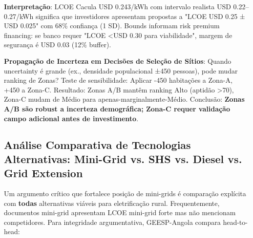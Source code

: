 \documentclass[12pt, a4paper]{article}
\begin{document}
\textbf{Interpretação}: LCOE Cacula USD 0.243/kWh com intervalo realista USD 0.22–0.27/kWh significa que investidores apresentam propostas a "LCOE USD 0.25 ± USD 0.025" com 68\% confiança (1 SD). Bounds informam risk premium financing: se banco requer "LCOE <USD 0.30 para viabilidade", margem de segurança é USD 0.03 (12\% buffer).


\textbf{Propagação de Incerteza em Decisões de Seleção de Sítios}: Quando uncertainty é grande (ex., densidade populacional ±450 pessoas), pode mudar ranking de Zonas? Teste de sensibilidade: Aplicar -450 habitações a Zona-A, +450 a Zona-C. Resultado: Zonas A/B mantêm ranking Alto (aptidão >70), Zona-C mudam de Médio para apenas-marginalmente-Médio. Conclusão: 
\textbf{Zonas A/B são robust a incerteza demográfica; Zona-C requer validação campo adicional antes de investimento}.

\subsection{Análise Comparativa de Tecnologias Alternativas: Mini-Grid vs. SHS vs. Diesel vs. Grid Extension}

Um argumento crítico que fortalece posição de mini-grids é comparação explícita com \textbf{todas} alternativas viáveis para eletrificação rural. Frequentemente, documentos mini-grid apresentam LCOE mini-grid forte mas não mencionam competidores. Para integridade argumentativa, GEESP-Angola compara head-to-head:
\end{document}
